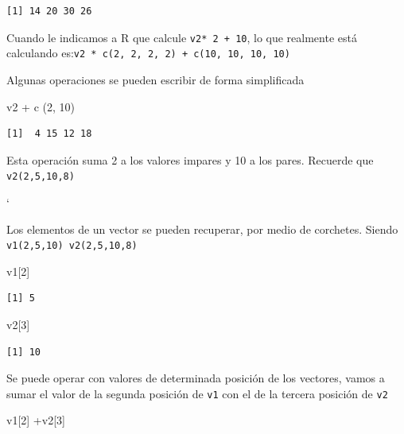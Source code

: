 \documentclass[
  letterpaper,
]{scrbook}
\newenvironment{Shaded}{\begin{snugshade}}{\end{snugshade}}
\newcommand{\DecValTok}[1]{\textcolor[rgb]{0.68,0.00,0.00}{#1}}
\newcommand{\FunctionTok}[1]{\textcolor[rgb]{0.28,0.35,0.67}{#1}}
\newcommand{\NormalTok}[1]{\textcolor[rgb]{0.00,0.23,0.31}{#1}}
\newcommand{\SpecialCharTok}[1]{\textcolor[rgb]{0.37,0.37,0.37}{#1}}
\begin{document}
\begin{verbatim}
[1] 14 20 30 26
\end{verbatim}

Cuando le indicamos a R que calcule \texttt{v2*\ 2\ +\ 10}, lo que
realmente está calculando
es:\texttt{v2\ *\ c(2,\ 2,\ 2,\ 2)\ +\ c(10,\ 10,\ 10,\ 10)}

Algunas operaciones se pueden escribir de forma simplificada

\begin{Shaded}
\begin{Highlighting}[]
\NormalTok{v2 }\SpecialCharTok{+} \FunctionTok{c}\NormalTok{ (}\DecValTok{2}\NormalTok{, }\DecValTok{10}\NormalTok{)}
\end{Highlighting}
\end{Shaded}

\begin{verbatim}
[1]  4 15 12 18
\end{verbatim}

Esta operación suma 2 a los valores impares y 10 a los pares. Recuerde
que \texttt{v2(2,5,10,8)}

`

Los elementos de un vector se pueden recuperar, por medio de corchetes.
Siendo \texttt{v1(2,5,10)\ v2(2,5,10,8)}

\begin{Shaded}
\begin{Highlighting}[]
\NormalTok{v1[}\DecValTok{2}\NormalTok{]}
\end{Highlighting}
\end{Shaded}

\begin{verbatim}
[1] 5
\end{verbatim}

\begin{Shaded}
\begin{Highlighting}[]
\NormalTok{v2[}\DecValTok{3}\NormalTok{]}
\end{Highlighting}
\end{Shaded}

\begin{verbatim}
[1] 10
\end{verbatim}

Se puede operar con valores de determinada posición de los vectores,
vamos a sumar el valor de la segunda posición de \texttt{v1} con el de
la tercera posición de \texttt{v2}

\begin{Shaded}
\begin{Highlighting}[]
\NormalTok{v1[}\DecValTok{2}\NormalTok{] }\SpecialCharTok{+}\NormalTok{v2[}\DecValTok{3}\NormalTok{]}
\end{Highlighting}
\end{Shaded}
\end{document}
